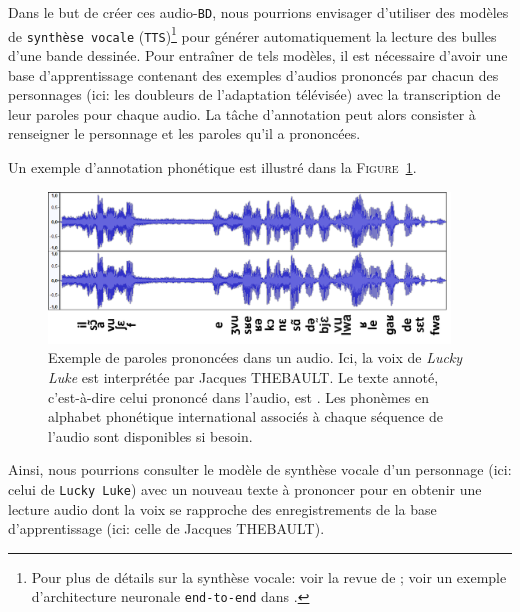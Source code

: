 			Dans le but de créer ces audio-\texttt{BD}, nous pourrions envisager d'utiliser des modèles de \texttt{synthèse vocale} (\texttt{TTS})\footnote{
				Pour plus de détails sur la synthèse vocale: voir la revue de \cite{kothadiya-etal:2020:different-methods-review} ; voir un exemple d'architecture neuronale \texttt{end-to-end} dans \cite{mu-etal:2021:review-endtoend-speech}.
			} pour générer automatiquement la lecture des bulles d'une bande dessinée.
			Pour entraîner de tels modèles, il est nécessaire d'avoir une base d'apprentissage contenant des exemples d'audios prononcés par chacun des personnages (ici: les doubleurs de l'adaptation télévisée) avec la transcription de leur paroles pour chaque audio.
			La tâche d'annotation peut alors consister à renseigner le personnage et les paroles qu'il a prononcées.
			
			Un exemple d'annotation phonétique est illustré dans la \textsc{Figure~\ref{figure:2.1.2.D-PRESENTATION-ANNOTATION-EXEMPLES-TRANSCRIPTION}}.
			\begin{leftBarExamples}
				\begin{figure}[H]
					\centering
					\includegraphics[width=0.95\textwidth]{figures/etatdelart-thebault-transcription}
					\caption{
						Exemple de paroles prononcées dans un audio.
						Ici, la voix de \textit{Lucky Luke} est interprétée par Jacques THEBAULT.
						Le texte annoté, c'est-à-dire celui prononcé dans l'audio, est  .
						Les phonèmes en alphabet phonétique international associés à chaque séquence de l'audio sont disponibles si besoin.
					}
					\label{figure:2.1.2.D-PRESENTATION-ANNOTATION-EXEMPLES-TRANSCRIPTION}
				\end{figure}
			\end{leftBarExamples}
			
			Ainsi, nous pourrions consulter le modèle de synthèse vocale d'un personnage (ici: celui de \texttt{Lucky Luke}) avec un nouveau texte à prononcer pour en obtenir une lecture audio dont la voix se rapproche des enregistrements de la base d'apprentissage (ici: celle de Jacques THEBAULT).
			
